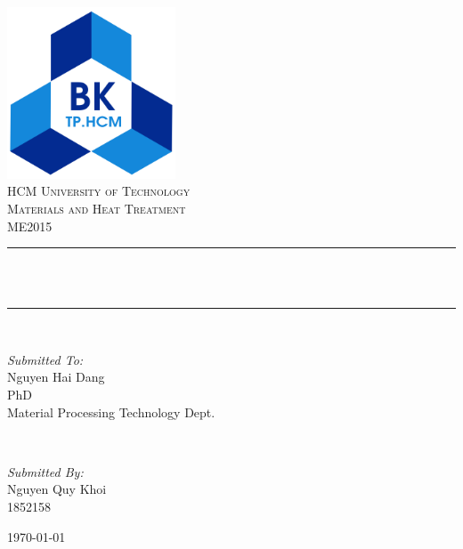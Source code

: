 \documentclass{presets}
\begin{document}
	\begin{titlepage}
		\centering
		\includegraphics[width=5cm]{logo.png}\\[1.0 cm]	%
		\textsc{\LARGE HCM University of Technology}\\[1cm] %
		\textsc{\Large Materials and Heat Treatment}\\[0.5cm] %

		\textsc{\Large ME2015}\\[0.5 cm]
		\rule{\linewidth}{0.2 mm} \\[0.4 cm]
		{ \huge \bfseries \thetitle}\\
		\rule{\linewidth}{0.2 mm}\\[1.5cm]
		
		\begin{minipage}[t]{0.4\textwidth}
			\begin{flushleft} \large
				\emph{Submitted To:}\\
				Nguyen Hai Dang\\
				PhD\\
				Material Processing Technology Dept.\\
			\end{flushleft}
		\end{minipage}~
		\begin{minipage}[t]{0.4\textwidth}
			
			\begin{flushright} \large
				\emph{Submitted By:} \\
				Nguyen Quy Khoi\\
				1852158
			\end{flushright}
			
		\end{minipage}
		\mbox{}\vfill
		{\large \today}
	\end{titlepage}
	\tableofcontents
	\listoftables
	\listoffigures
	
	
	
\end{document}
